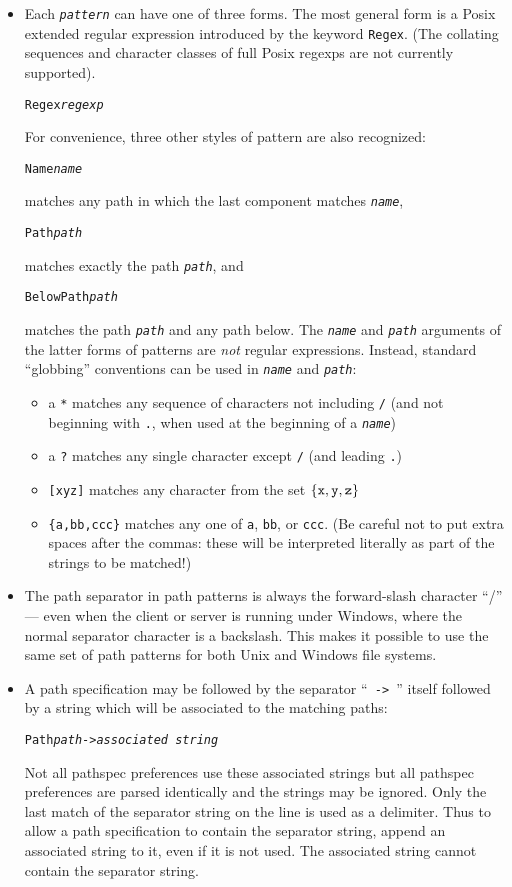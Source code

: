 \documentclass{article}
\newcommand{\ARG}[1]{\texttt{\textit{#1}}}
\begin{document}
\begin{itemize}
\item Each \ARG{pattern} can have one of three forms.  The most
general form is a Posix extended regular expression introduced by the
keyword \verb|Regex|.  (The collating sequences and character classes of
full Posix regexps are not currently supported).
\begin{alltt}
                 Regex \ARG{regexp}
\end{alltt}
For convenience, three other styles of pattern are also recognized:
\begin{alltt}
                 Name \ARG{name}
\end{alltt}
matches any path in which the last component matches \ARG{name},
\begin{alltt}
                 Path \ARG{path}
\end{alltt}
matches exactly the path \ARG{path}, and
\begin{alltt}
                 BelowPath \ARG{path}
\end{alltt}
matches the path \ARG{path} and any path below.
%
The \ARG{name} and \ARG{path} arguments of the latter forms of
patterns are {\em not} regular expressions.  Instead,
standard ``globbing'' conventions can be used in \ARG{name} and
\ARG{path}:
\begin{itemize}
\item a \verb|*| matches any sequence of characters not including \verb|/|
(and not beginning with \verb|.|, when used at the beginning of a
\ARG{name})
\item a \verb|?| matches any single character except \verb|/| (and leading
  \verb|.|)
\item \verb|[xyz]| matches any character from the set $\{{\tt x},
  {\tt y}, {\tt z} \}$
\item \verb|{a,bb,ccc}| matches any one of \verb|a|, \verb|bb|, or
  \verb|ccc|.  (Be careful not to put extra spaces after the commas:
  these will be interpreted literally as part of the strings to be matched!)
\end{itemize}
\item
The path separator in path patterns is always the
forward-slash character ``/'' --- even when the client or server is
running under Windows, where the normal separator character is a
backslash.  This makes it possible to use the same set of path
patterns for both Unix and Windows file systems.
\item
A path specification may be followed by the separator ``\verb| -> |'' itself
followed by a string which will be associated to the matching paths:
\begin{alltt}
                 Path \ARG{path} -> \ARG{associated string}
\end{alltt}
Not all pathspec preferences use these associated strings but all pathspec
preferences are parsed identically and the strings may be ignored.  Only the
last match of the separator string on the line is used as a delimiter.  Thus
to allow a path specification to contain the separator string, append an
associated string to it, even if it is not used.  The associated string cannot
contain the separator string.
\end{itemize}
\end{document}
